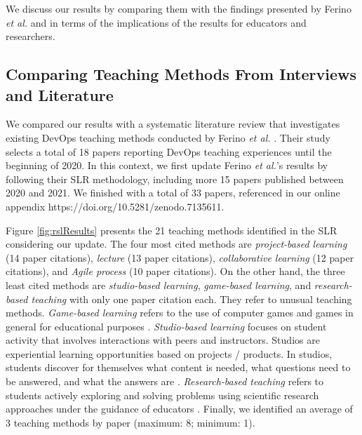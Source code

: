 \documentclass[10pt,conference]{IEEEtran}
\begin{document}
We discuss our results by comparing them with the findings presented by Ferino \textit{et al.} \cite{ferino:2021} and in terms of the implications of the results for educators and researchers.





\subsection{Comparing Teaching Methods From Interviews and Literature} 

We compared our results with a systematic literature review that investigates existing DevOps teaching methods conducted by Ferino \textit{et al.} \cite{ferino:2021}. Their study selects a total of 18 papers reporting DevOps teaching experiences until the beginning of 2020. In this context, we first update Ferino \textit{et al.}'s results \cite{ferino:2021} by following their SLR methodology, including more 15 papers published between 2020 and 2021.   We finished with a total of 33 papers, referenced in our online appendix https://doi.org/10.5281/zenodo.7135611.

Figure \ref{fig:rslResults} presents the 21 teaching methods identified in the SLR considering our update. The four most cited methods are \textsl{project-based learning} (14 paper citations), \textsl{lecture} (13 paper citations), \textsl{collaborative learning} (12 paper citations), and \textsl{Agile process} (10 paper citations). On the other hand, the three least cited methods are \textsl{studio-based learning}, \textsl{game-based learning}, and \textsl{research-based teaching} with only one paper citation each. They refer to unusual teaching methods. \textsl{Game-based learning} refers to the use of computer games and games in general for educational purposes \cite{pivec:2003}. \textsl{Studio-based learning} focuses on student activity that involves interactions with peers and instructors. Studios are experiential learning opportunities based on projects / products. In studios, students discover for themselves what content is needed, what questions need to be answered, and what the answers are \cite{trede:2021}. \textsl{Research-based teaching} refers to students actively exploring and solving problems using scientific research approaches under the guidance of educators \cite{ye:2017}. Finally, we identified an average of 3 teaching methods by paper (maximum: 8; minimum: 1).  
\end{document}
